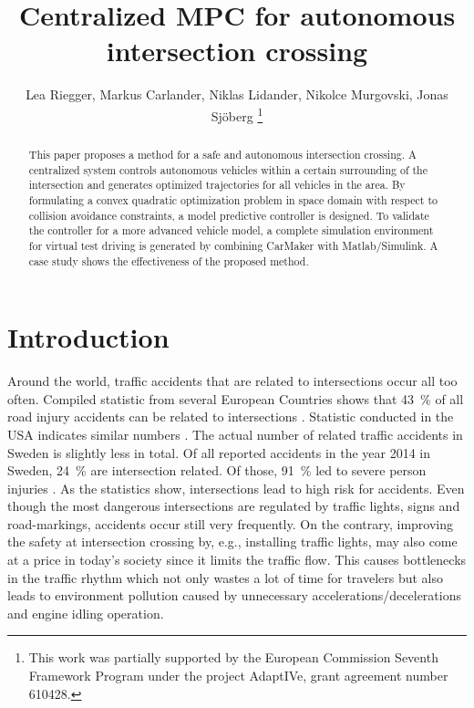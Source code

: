 \documentclass[letterpaper,10pt,conference]{ieeeconf}
\author{Lea Riegger, Markus Carlander, Niklas Lidander, Nikolce Murgovski, Jonas Sj\"oberg
\thanks{This work was partially supported by the European Commission Seventh Framework
Program under the project AdaptIVe, grant agreement number 610428.}}
\begin{document}
\title{Centralized MPC for autonomous intersection crossing}

\maketitle
\thispagestyle{empty}
\pagestyle{empty}

\begin{abstract}
This paper proposes a method for a safe and autonomous intersection crossing. A centralized system controls autonomous vehicles within a certain surrounding of the intersection and generates optimized trajectories for all vehicles in the area. By formulating a convex quadratic optimization problem in space domain with respect to collision avoidance constraints, a model predictive controller is designed. To validate the controller for a more advanced vehicle model, a complete simulation environment for virtual test driving is generated by combining CarMaker with Matlab/Simulink. A case study shows the effectiveness of the proposed method.
\end{abstract}

\IEEEpeerreviewmaketitle

\section{Introduction}%

Around the world, traffic accidents that are related to intersections occur all too often. Compiled statistic from several European Countries shows that \SI{43}{\%} of all road injury accidents can be related to intersections \cite{molinero}. Statistic conducted in the USA indicates similar numbers \cite{nhtsa}. The actual number of related traffic accidents in Sweden is slightly less in total. Of all reported accidents in the year 2014 in Sweden, \SI{24}{\%} are intersection related. Of those, \SI{91}{\%} led to severe person injuries \cite{sverige}. As the statistics show, intersections lead to high risk for accidents. Even though the most dangerous intersections are regulated by traffic lights, signs and road-markings, accidents occur still very frequently. On the contrary, improving the safety at intersection crossing by, e.g., installing traffic lights, may also come at a price in today's society since it limits the traffic flow. This causes bottlenecks in the traffic rhythm which not only wastes a lot of time for travelers but also leads to environment pollution caused by unnecessary accelerations/decelerations and engine idling operation.
\end{document}
